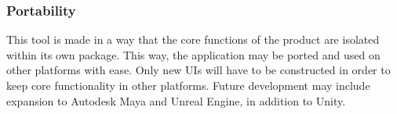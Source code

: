 \subsubsection{Portability}
This tool is made in a way that the core functions of the product are isolated within its own package. This way, the application may be ported and used on other platforms with ease. Only new UIs will have to be constructed in order to keep core functionality in other platforms. Future development may include expansion to Autodesk Maya and Unreal Engine, in addition to Unity.
